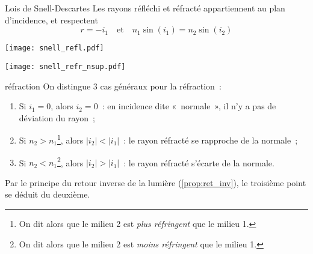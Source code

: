 \documentclass[../main/main.tex]{subfiles}
\begin{document}
\begin{loi}[label=loi:snelldescartes]{Lois de Snell-Descartes}
    Les rayons réfléchi et réfracté appartiennent au plan d'incidence,
    et respectent
    \begin{equation*}
        \boxed{r = -i_1}
        \quad\text{et}\quad
        \boxed{n_1\sin(i_1) = n_2\sin(i_2)}
    \end{equation*}
    \tcblower
    \begin{minipage}{0.45\linewidth}
        \begin{center}
            \texttt{[image: snell\_refl.pdf]}
            \label{fig:snell_refl}
        \end{center}
    \end{minipage}
    \hfill
    \begin{minipage}{0.45\linewidth}
        \begin{center}
            \texttt{[image: snell\_refr\_nsup.pdf]}
            \label{fig:snell_refl}
        \end{center}
    \end{minipage}
\end{loi}

\begin{impl}[label=impl:refr]{réfraction}
    On distingue 3 cas généraux pour la réfraction~:
    \begin{enumerate}

        \item Si $i_1 = 0$, alors $i_2 = 0$~: en incidence dite «~normale~», il
            n'y a pas de déviation du rayon~;
        \item Si $n_2 > n_1$\footnote{On dit alors que le milieu 2 est
            \textit{plus réfringent} que le milieu 1.}, alors $ \left| i_2
            \right| < \left| i_1 \right|$~: le rayon réfracté se rapproche de la
            normale~;
        \item Si $n_2 < n_1$\footnote{On dit alors que le milieu 2 est
            \textit{moins réfringent} que le milieu 1.}, alors $|i_2| > |i_1|$~:
            le rayon réfracté s'écarte de la normale.

    \end{enumerate}
    Par le principe du retour inverse de la lumière (\ref{prop:ret_inv}), le
    troisième point se déduit du deuxième.
\end{impl}
\end{document}
